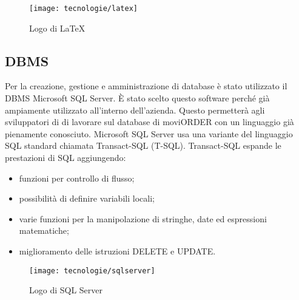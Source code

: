 \begin{figure}[!h] 
    \centering 
    \texttt{[image: tecnologie/latex]} 
    \caption{Logo di \LaTeX{}}
\end{figure}

\subsection{DBMS}

Per la creazione, gestione e amministrazione di database è stato utilizzato il DBMS Microsoft SQL Server. È stato scelto questo software perché già ampiamente utilizzato all'interno dell'azienda. Questo permetterà agli sviluppatori di \visione{} di lavorare sul database di moviORDER con un linguaggio già pienamente conosciuto. Microsoft SQL Server usa una variante del linguaggio SQL standard chiamata Transact-SQL (T-SQL). Transact-SQL espande le prestazioni di SQL aggiungendo:
\begin{itemize}
	\item funzioni per controllo di flusso;
	\item possibilità di definire variabili locali;
	\item varie funzioni per la manipolazione di stringhe, date ed espressioni matematiche;
	\item miglioramento delle istruzioni DELETE e UPDATE.
\end{itemize}

\begin{figure}[!h] 
    \centering 
    \texttt{[image: tecnologie/sqlserver]} 
    \caption{Logo di SQL Server}
\end{figure}
